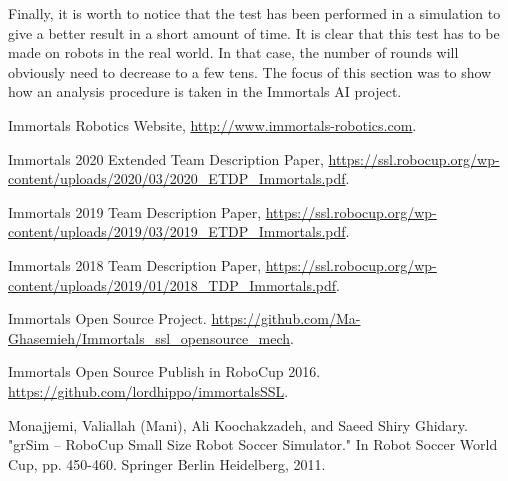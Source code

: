 \documentclass[runningheads]{llncs}
\begin{document}
Finally, it is worth to notice that the test has been performed in a simulation to give a better result in a short amount of time. It is clear that this test has to be made on robots in the real world. In that case, the number of rounds will obviously need to decrease to a few tens. The focus of this section was to show how an analysis procedure is taken in the Immortals AI project.

%






\newpage
\begin{thebibliography}{8}
Immortals Robotics Website, \url{http://www.immortals-robotics.com}.

Immortals 2020 Extended Team Description Paper, \url{https://ssl.robocup.org/wp-content/uploads/2020/03/2020\_ETDP\_Immortals.pdf}.

Immortals 2019 Team Description Paper, \url{https://ssl.robocup.org/wp-content/uploads/2019/03/2019\_ETDP\_Immortals.pdf}.

Immortals 2018 Team Description Paper, \url{https://ssl.robocup.org/wp-content/uploads/2019/01/2018\_TDP\_Immortals.pdf}.

Immortals Open Source Project. \url{https://github.com/Ma-Ghasemieh/Immortals\_ssl\_opensource\_mech}.

Immortals Open Source Publish in RoboCup 2016. \url{https://github.com/lordhippo/immortalsSSL}.

Monajjemi, Valiallah (Mani), Ali Koochakzadeh, and Saeed Shiry Ghidary. "grSim – RoboCup Small Size Robot Soccer Simulator." In Robot Soccer World Cup, pp. 450-460. Springer Berlin Heidelberg, 2011.

\end{thebibliography}
\end{document}
